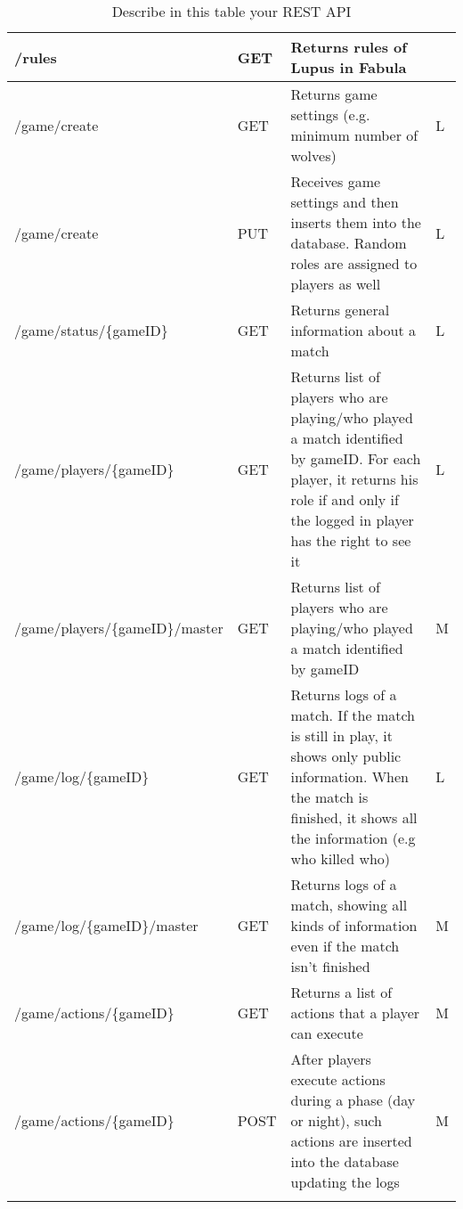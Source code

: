 \begin{longtable}{|p{}|p{} |p{}|p{}|}
/rules & GET & Returns rules of Lupus in Fabula &  \\\hline

/game/create & GET & Returns game settings (e.g. minimum number of wolves) & L \\\hline
/game/create & PUT & Receives game settings and then inserts them into the database. Random roles are assigned to players as well & L \\\hline
/game/status/\{gameID\} & GET & Returns general information about a match & L \\\hline

/game/players/\{gameID\}& GET & Returns list of players who are playing/who played a match identified by gameID. For each player, it returns his role if and only if the logged in player has the right to see it & L \\\hline
/game/players/\{gameID\}/master & GET & Returns list of players who are playing/who played a match identified by gameID & M \\\hline

/game/log/\{gameID\} & GET & Returns logs of a match. If the match is still in play, it shows only public information. When the match is finished, it shows all the information (e.g who killed who) & L \\\hline
/game/log/\{gameID\}/master & GET & Returns logs of a match, showing all kinds of information even if the match isn't finished & M \\\hline


/game/actions/\{gameID\} & GET & Returns a list of actions that a player can execute & M \\\hline
/game/actions/\{gameID\} & POST & After players execute actions during a phase (day or night), such actions are inserted into the database updating the logs & M \\\hline

\caption{Describe in this table your REST API}
\label{tab:termGlossary}
\end{longtable}